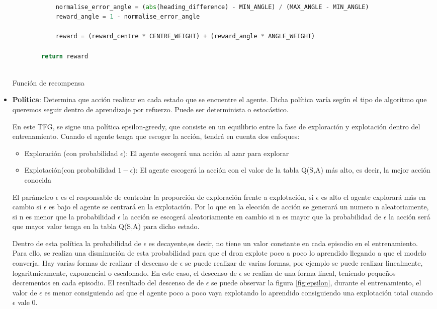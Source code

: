 \begin{itemize}
\begin{code}[H]
\begin{lstlisting}[language=Python]
            
            normalise_error_angle = (abs(heading_difference) - MIN_ANGLE) / (MAX_ANGLE - MIN_ANGLE)
            reward_angle = 1 - normalise_error_angle

            reward = (reward_centre * CENTRE_WEIGHT) + (reward_angle * ANGLE_WEIGHT)
            
        return reward
       
      \end{lstlisting}
      \caption[Función de recompensa]{Función de recompensa}
      \label{cod:recompensa}
      \end{code}
    \item \textbf{Política}: Determina que acción realizar en cada estado que se encuentre el agente. Dicha política varía según el tipo de algoritmo que queremos seguir 
    dentro de aprendizaje por refuerzo. Puede ser determinista o estocástico.

    En este TFG, se sigue una política epsilon-greedy\cite{Epsilon-greedy}, que consiste en un equilibrio entre la fase de exploración y explotación dentro 
    del entrenamiento. Cuando el agente tenga que escoger la acción, tendrá en cuenta dos enfoques:
 
 \begin{itemize}
   \item Exploración (con probabilidad $\epsilon$): El agente escogerá una acción al azar para explorar
   \item Explotación(con probabilidad $ 1 - \epsilon$): El agente escogerá la acción con el valor de la tabla Q(S,A) más alto, es decir, la mejor acción conocida
 \end{itemize}
 
 El parámetro $\epsilon$ es el responsable de controlar la proporción de exploración frente a explotación, si $\epsilon$ es alto el agente explorará más en cambio si $\epsilon$ es bajo
 el agente se centrará en la explotación. Por lo que en la elección de acción se generará un numero n aleatoriamente, si n es menor que la probabilidad $\epsilon$ la acción se escogerá aleatoriamente
 en cambio si n es mayor que la probabilidad de $\epsilon$ la acción será que mayor valor tenga en la tabla Q(S,A) para dicho estado. \newline
 
 Dentro de esta política la probabilidad de $\epsilon$ es decayente,es decir, no tiene un valor constante en cada episodio en el entrenamiento. Para ello, se realiza una disminución 
 de esta probabilidad para que el dron explote poco a poco lo aprendido llegando a que el modelo converja. Hay varias formas de realizar el descenso
 de $\epsilon$ se puede realizar de varias formas, por ejemplo se puede realizar linealmente, logaritmicamente, exponencial o escalonado. En este caso, el descenso de $\epsilon$ se realiza 
 de una forma líneal, teniendo pequeños decrementos en cada episodio. El resultado del descenso de de $\epsilon$ se puede observar la figura \ref{fig:epsilon}, durante el entrenamiento, el valor
 de $\epsilon$ es menor consiguiendo así que el agente poco a poco vaya explotando lo aprendido consiguiendo una explotación total cuando $\epsilon$ vale 0. 


\end{itemize}
